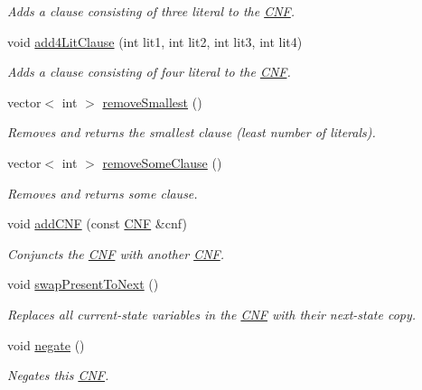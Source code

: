 \begin{DoxyCompactItemize}
\begin{DoxyCompactList}\small\item\em Adds a clause consisting of three literal to the \hyperlink{classCNF}{C\-N\-F}. \end{DoxyCompactList}\item 
void \hyperlink{classCNF_adc908d03185c0baad55c5b240ed667b3}{add4\-Lit\-Clause} (int lit1, int lit2, int lit3, int lit4)
\begin{DoxyCompactList}\small\item\em Adds a clause consisting of four literal to the \hyperlink{classCNF}{C\-N\-F}. \end{DoxyCompactList}\item 
vector$<$ int $>$ \hyperlink{classCNF_ad2ccf3122438927b7d5989c34651bd7e}{remove\-Smallest} ()
\begin{DoxyCompactList}\small\item\em Removes and returns the smallest clause (least number of literals). \end{DoxyCompactList}\item 
vector$<$ int $>$ \hyperlink{classCNF_ac7fef61f8d052bfca0f5cd8f80ca8e1d}{remove\-Some\-Clause} ()
\begin{DoxyCompactList}\small\item\em Removes and returns some clause. \end{DoxyCompactList}\item 
void \hyperlink{classCNF_a037291a95be5b4ec0c14755fd0e18826}{add\-C\-N\-F} (const \hyperlink{classCNF}{C\-N\-F} \&cnf)
\begin{DoxyCompactList}\small\item\em Conjuncts the \hyperlink{classCNF}{C\-N\-F} with another \hyperlink{classCNF}{C\-N\-F}. \end{DoxyCompactList}\item 
void \hyperlink{classCNF_aff6cbbe38a345089b278061f9d0195be}{swap\-Present\-To\-Next} ()
\begin{DoxyCompactList}\small\item\em Replaces all current-\/state variables in the \hyperlink{classCNF}{C\-N\-F} with their next-\/state copy. \end{DoxyCompactList}\item 
void \hyperlink{classCNF_a1d4371fd3b970bde2e8542ab5ad0f881}{negate} ()
\begin{DoxyCompactList}\small\item\em Negates this \hyperlink{classCNF}{C\-N\-F}. \end{DoxyCompactList}\item 

\end{DoxyCompactItemize}
